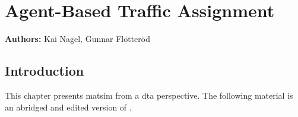 \def\todoNextRevision#1{{\color{blue}[[``todo next revision'': #1]]}}


\chapter{Agent-Based Traffic Assignment}
\label{ch:abta}

\hfill \textbf{Authors:} Kai Nagel, Gunnar Flötteröd



\section{Introduction}
\label{sec:agenbased-dta-intro}

This chapter presents \gls{matsim} from a \gls{dta} perspective. 
The following material is an abridged and edited version of \citet{NagelFloetteroed2009IatbrResourceInBook}.







